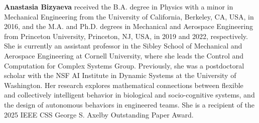 \documentclass[a4paper]{cas-dc}
\begin{document}
\textbf{Anastasia Bizyaeva} received the B.A. degree in Physics with a minor in Mechanical Engineering from the University of California, Berkeley, CA, USA, in 2016, and the M.A. and Ph.D. degrees in Mechanical and Aerospace Engineering from Princeton University, Princeton, NJ, USA, in 2019 and 2022, respectively. She is currently an assistant professor in the Sibley School of Mechanical and Aerospace Engineering at Cornell University, where she leads the Control and Computation for Complex Systems Group. Previously, she was a postdoctoral scholar with the NSF AI Institute in Dynamic Systems at the University of Washington. Her research explores mathematical connections between flexible and collectively intelligent behavior in biological and socio-cognitive systems, and the design of autonomous behaviors in engineered teams. She is a recipient of the 2025 IEEE CSS George S. Axelby Outstanding Paper Award.
\endbio
\end{document}
